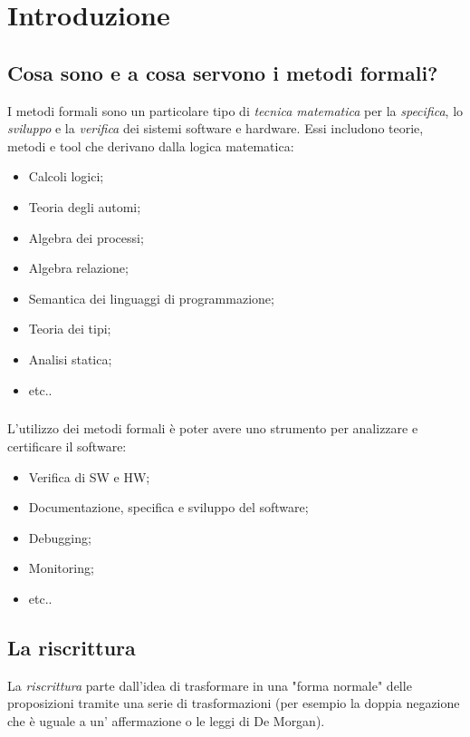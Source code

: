 \chapter{Introduzione}

\section{Cosa sono e a cosa servono i metodi formali?}

I metodi formali sono un particolare tipo di \textit{tecnica matematica} per la \textit{specifica}, lo \textit{sviluppo} e la \textit{verifica} dei sistemi software e hardware. 
Essi includono teorie, metodi e tool che derivano dalla logica matematica:

\begin{itemize}
    \item Calcoli logici;
    \item Teoria degli automi;
    \item Algebra dei processi;
    \item Algebra relazione;
    \item Semantica dei linguaggi di programmazione;
    \item  Teoria dei tipi;
    \item Analisi statica;
    \item etc..
\end{itemize}
\paragraph{}
L'utilizzo dei metodi formali è poter avere uno strumento per analizzare e certificare il software:

\begin{itemize}
    \item Verifica di SW e HW;
    \item Documentazione, specifica e sviluppo del software;
    \item Debugging;
    \item Monitoring;
    \item etc..
\end{itemize}

\section{La riscrittura}

La \textit{riscrittura} parte dall'idea di trasformare in una "forma normale" delle proposizioni tramite una serie di trasformazioni (per esempio la doppia negazione che è uguale a un' affermazione o le leggi di De Morgan).

